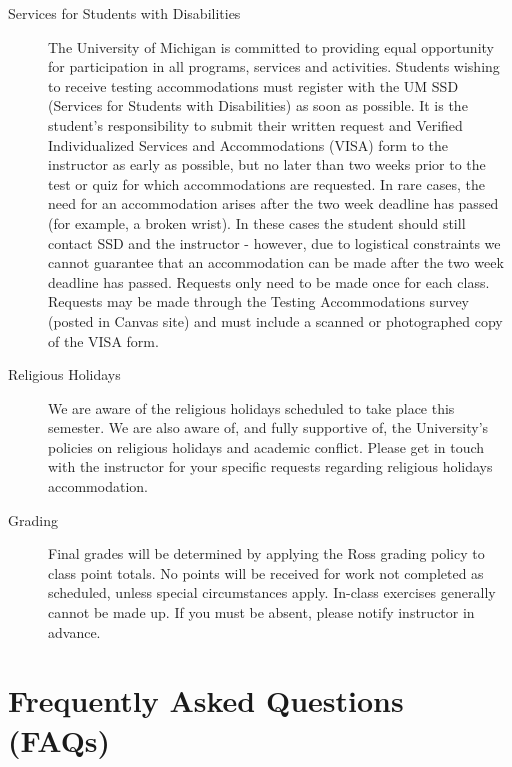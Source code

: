 \documentclass[10pt, letterpaper, twoside]{memoir}\usepackage{knitr}
\begin{document}
\begin{description}
\item [Services for Students with Disabilities] The University of Michigan is committed to providing equal opportunity for participation in all programs, services and activities. Students wishing to receive testing accommodations must register with the UM SSD (Services for Students with Disabilities) as soon as possible. It is the student's responsibility to submit their written request and Verified Individualized Services and Accommodations (VISA) form to the instructor as early as possible, but no later than two weeks prior to the test or quiz for which accommodations are requested. In rare cases, the need for an accommodation arises after the two week deadline has passed (for example, a broken wrist). In these cases the student should still contact SSD and the instructor - however, due
to logistical constraints we cannot guarantee that an accommodation can be made after the two week deadline has passed. Requests only need to be made once for each class. Requests may be made through the Testing Accommodations survey (posted in Canvas site) and must include a scanned or photographed copy of the VISA form.

\item [Religious Holidays] We are aware of the religious holidays scheduled to take place this semester. We are also aware of, and fully supportive of, the University's policies on religious holidays and academic conflict. Please get in touch with the instructor for your specific requests regarding religious holidays accommodation.

\item [Grading] Final grades will be determined by applying the Ross grading policy to class point totals. No points will be received for work not completed as scheduled, unless special circumstances apply. In-class exercises generally cannot be made up. If you must be absent, please notify instructor in advance. 

\end{description}

\section{Frequently Asked Questions (FAQs)}
\end{document}
